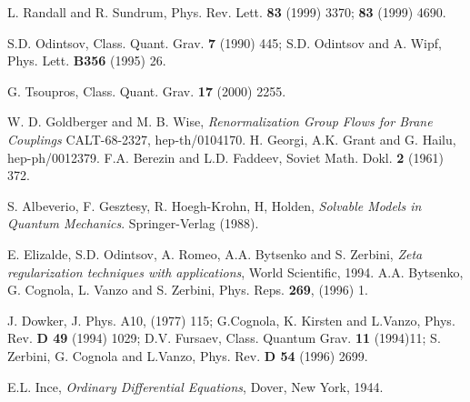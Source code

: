 \documentclass[a4paper,aps,prl,preprint,groupedaddress,showpacs,nobibnotes,tightenlines]{revtex4}
\begin{document}
 



\begin{thebibliography}{99}

 L. Randall and R. Sundrum, Phys. Rev. Lett. {\bf 83} (1999) 3370;
{\bf 83} (1999) 4690.

 S.D. Odintsov, Class. Quant. Grav. {\bf 7} (1990) 445;
S.D. Odintsov and A. Wipf, Phys. Lett. {\bf B356} (1995) 26.

 G. Tsoupros, Class. Quant. Grav. {\bf 17} (2000) 2255.

W. D. Goldberger and M. B. Wise,
{\em Renormalization Group Flows for Brane Couplings}
CALT-68-2327, hep-th/0104170.
H. Georgi, A.K. Grant and G. Hailu, hep-ph/0012379.
F.A. Berezin and L.D. Faddeev,
Soviet Math. Dokl. {\bf 2} (1961) 372.

S. Albeverio, F. Gesztesy, R. Hoegh-Krohn, H, Holden,
{\em Solvable Models in Quantum Mechanics}.
Springer-Verlag (1988).

E. Elizalde, S.D. Odintsov, A. Romeo, A.A. Bytsenko and S. Zerbini,
{ \em Zeta regularization techniques with applications}, World Scientific, 1994.
A.A. Bytsenko, G. Cognola, L. Vanzo  and S. Zerbini,
Phys. Reps. {\bf 269}, (1996) 1.

J. Dowker, J. Phys. A10, (1977) 115; G.Cognola, K. Kirsten and L.Vanzo,
Phys. Rev. {\bf D 49} (1994) 1029; D.V. Fursaev, Class. Quantum Grav. {\bf 11}
(1994)11; S. Zerbini, G. Cognola and L.Vanzo, 
Phys. Rev. {\bf D 54} (1996) 2699. 
 
 
 E.L. Ince,
{\it Ordinary Differential Equations}, Dover, 
New York, 1944.


\end{thebibliography}
\end{document}
